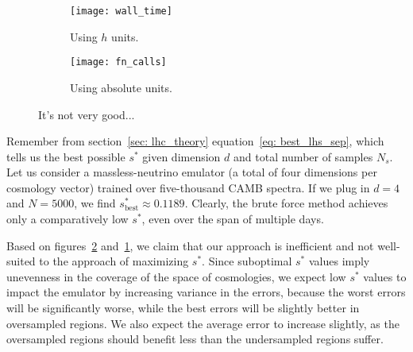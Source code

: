 \begin{figure}[ht!]
    \begin{subfigure}{0.45 \textwidth}
    \centering
 		\texttt{[image: wall\_time]}
 		\caption{Using $h$ units.}
 		\label{fig: wall_time}
    \end{subfigure}
    \begin{subfigure}{0.45 \textwidth}
    \centering
 		\texttt{[image: fn\_calls]}
 		\caption{Using absolute units.}
 		\label{fig: function_calls}
    \end{subfigure}
        \centering
    \caption[Efficiency of Brute-Force LHS Approach]
    		{It's not very good...}
    \label{fig: random_lhs_performance}
\end{figure}

\begin{comment} %
we left the system to run for two days. In this time, the 
largest minimum separation that we generated was approximately 0.08022.  
Recall from section sec_B1 that the theoretical best possible value for this 
setup is approximately 0.24183. It would have been more meaningful if you had 
counted the total number of function calls, but it isn’t too late to set up 
such a run. So, even after assigning a relatively large amount of compute to 
this brute force solution, we fail to obtain an LHC of even a third of the 
best minimum separation.
\end{comment} 

Remember from section~\ref{sec: lhc_theory} equation~\ref{eq: best_lhs_sep},
which tells us the best possible $s^*$
given dimension $d$ and total number of samples $N_s$. Let us consider a 
massless-neutrino emulator (a total of four dimensions per cosmology vector)
trained over five-thousand CAMB spectra. If we plug in $d = 4$ and $N=5000$,
we find $s^*_\text{best} \approx 0.1189$. Clearly, the brute force method
achieves only a comparatively low $s^*$, even over the span of multiple days.

Based on figures~\ref{fig: function_calls} and~\ref{fig: wall_time}, we
claim that our approach is inefficient and not well-suited to the approach of 
maximizing $s^*$. Since suboptimal $s^*$ values imply unevenness in the
coverage of the space of cosmologies, we expect low $s^*$ values to impact
the emulator by increasing variance in the errors, because the worst errors
will be significantly worse, while the best errors will be slightly better in
oversampled regions. We also expect the average error to increase slightly,
as the oversampled regions should benefit less than the undersampled regions
suffer.

